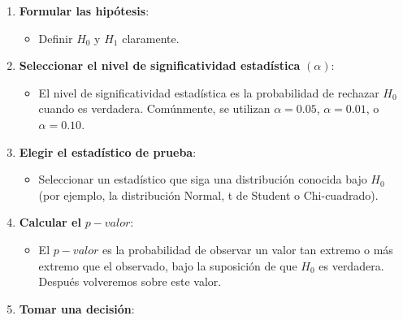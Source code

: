 \documentclass[
  letterpaper,
  DIV=11,
  numbers=noendperiod]{scrreprt}
\providecommand{\tightlist}{%
  \setlength{\itemsep}{0pt}\setlength{\parskip}{0pt}}\usepackage{longtable,booktabs,array}
\begin{document}
\begin{enumerate}
\def\labelenumi{\arabic{enumi}.}
\tightlist
\item
  \textbf{Formular las hipótesis}:

  \begin{itemize}
  \tightlist
  \item
    Definir \(H_0\) y \(H_1\) claramente.
  \end{itemize}
\item
  \textbf{Seleccionar el nivel de significatividad estadística}
  \((\alpha)\):

  \begin{itemize}
  \tightlist
  \item
    El nivel de significatividad estadística es la probabilidad de
    rechazar \(H_0\) cuando es verdadera. Comúnmente, se utilizan
    \(\alpha = 0.05\), \(\alpha = 0.01\), o \(\alpha = 0.10\).
  \end{itemize}
\item
  \textbf{Elegir el estadístico de prueba}:

  \begin{itemize}
  \tightlist
  \item
    Seleccionar un estadístico que siga una distribución conocida bajo
    \(H_0\) (por ejemplo, la distribución Normal, t de Student o
    Chi-cuadrado).
  \end{itemize}
\item
  \textbf{Calcular el} \(p-valor\):

  \begin{itemize}
  \tightlist
  \item
    El \(p-valor\) es la probabilidad de observar un valor tan extremo o
    más extremo que el observado, bajo la suposición de que \(H_0\) es
    verdadera. Después volveremos sobre este valor.
  \end{itemize}
\item
  \textbf{Tomar una decisión}:


\end{enumerate}
\end{document}
